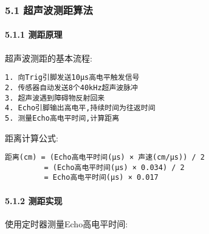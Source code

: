\documentclass[
]{article}
\begin{document}
\hypertarget{ux8d85ux58f0ux6ce2ux6d4bux8dddux7b97ux6cd5}{%
\subsubsection{5.1
超声波测距算法}\label{ux8d85ux58f0ux6ce2ux6d4bux8dddux7b97ux6cd5}}

\hypertarget{ux6d4bux8dddux539fux7406}{%
\paragraph{5.1.1 测距原理}\label{ux6d4bux8dddux539fux7406}}

超声波测距的基本流程:

\begin{verbatim}
1. 向Trig引脚发送10μs高电平触发信号
2. 传感器自动发送8个40kHz超声波脉冲
3. 超声波遇到障碍物反射回来
4. Echo引脚输出高电平,持续时间为往返时间
5. 测量Echo高电平时间,计算距离
\end{verbatim}

距离计算公式:

\begin{verbatim}
距离(cm) = (Echo高电平时间(μs) × 声速(cm/μs)) / 2
         = (Echo高电平时间(μs) × 0.034) / 2
         = Echo高电平时间(μs) × 0.017
\end{verbatim}

\hypertarget{ux6d4bux8dddux5b9eux73b0}{%
\paragraph{5.1.2 测距实现}\label{ux6d4bux8dddux5b9eux73b0}}

使用定时器测量Echo高电平时间:
\end{document}
